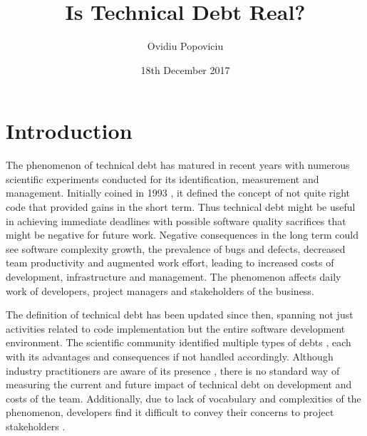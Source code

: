\documentclass{mprop}
\begin{document}
\title{Is Technical Debt Real?}
\author{Ovidiu Popoviciu}
\date{18th December 2017}
\maketitle

\tableofcontents
\newpage

\section{Introduction}
\label{intro}

The phenomenon of technical debt has matured in recent years with numerous
scientific experiments conducted for its identification, measurement and
management. Initially coined in 1993 \cite{Cunningham1993}, it defined the
concept of not quite right code that provided gains in the short term. Thus
technical debt might be useful in achieving immediate deadlines with possible
software quality sacrifices that might be negative for future work. Negative
consequences in the long term could see software complexity growth, the
prevalence of bugs and defects, decreased team productivity and augmented work
effort, leading to increased costs of development, infrastructure and
management. The phenomenon affects daily work of developers, project managers
and stakeholders of the business.

The definition of technical debt has been updated since then, spanning not just
activities related to code implementation but the entire software development
environment. The scientific community identified multiple types of debts
\cite{Li2015}, each with its advantages and consequences if not handled
accordingly. Although industry practitioners are aware of its presence
\cite{Codabux2013} \cite{Lim2012}, there is no standard way of measuring the
current and future impact of technical debt on development and costs of the
team. Additionally, due to lack of vocabulary and complexities of the
phenomenon, developers find it difficult to convey their concerns to project
stakeholders \cite{Kruchten2012}.
\end{document}
